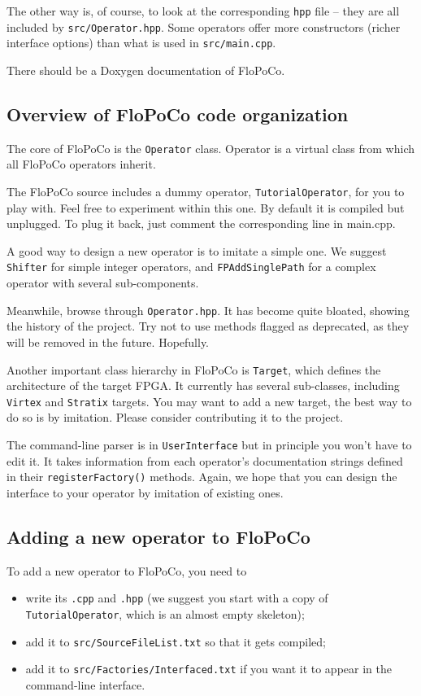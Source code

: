 \documentclass{article}
\begin{document}
The other way is, of course, to look at the corresponding \texttt{hpp}
file -- they are all included by \texttt{src/Operator.hpp}. Some
operators offer more constructors (richer interface options) than what
is used in \texttt{src/main.cpp}.


There should be a Doxygen documentation of FloPoCo.

\subsection{Overview of FloPoCo code organization}

The core of FloPoCo is the \texttt{Operator} class. 
Operator is a virtual class from which all FloPoCo operators inherit. 

The FloPoCo source includes a dummy operator, \texttt{TutorialOperator}, for you to play with. 
Feel free to experiment within this one. 
By default it is compiled but unplugged. To plug it back, just comment the corresponding line in main.cpp.

A good way to design a new operator is to imitate a simple one. We suggest
\texttt{Shifter} for simple integer operators, and \texttt{FPAddSinglePath}
for a complex operator with several sub-components.

Meanwhile, browse through \texttt{Operator.hpp}. It has become quite bloated, showing
the history of the project. Try not to use methods flagged as
deprecated, as they will be removed in the future. Hopefully.%

Another important class hierarchy in FloPoCo is \texttt{Target}, which
defines the architecture of the target FPGA. It currently has several sub-classes,
including \texttt{Virtex} and \texttt{Stratix} targets. You may want to
add a new target, the best way to do so is by imitation. Please
consider contributing it to the project.

The command-line parser is in \texttt{UserInterface} but in principle you won't have to edit it.
It takes information from each operator's documentation strings defined in their \texttt{registerFactory()} methods. 
Again, we hope that you can design the interface to your operator by imitation of existing ones.

\subsection{Adding a new operator to FloPoCo}
To add a new operator to FloPoCo, you need to 
\begin{itemize}
\item write its \texttt{.cpp} and \texttt{.hpp} (we suggest you start with a copy of  \texttt{TutorialOperator}, which is an almost empty skeleton);
\item add it to \texttt{src/SourceFileList.txt} so that it gets compiled;
\item add it to \texttt{src/Factories/Interfaced.txt} if you want it to appear in the command-line interface.
\end{itemize}
\end{document}
